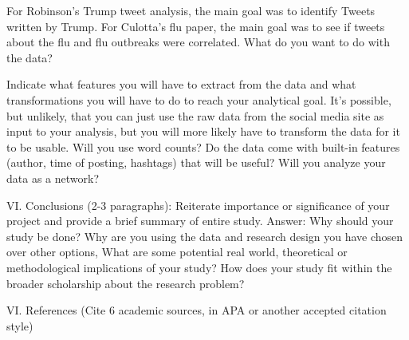 For Robinson's Trump tweet analysis, the main goal was to identify 
Tweets written by Trump. 
For Culotta's flu paper, the main goal was to see if tweets about the 
flu and flu outbreaks were correlated. 
What do you want to do with the data?

Indicate what features you will have to extract from the data and what transformations you will have to do to reach your analytical goal. It's possible, but unlikely, that you can just use the raw data from the social media site as input to your analysis, but you will more likely have to transform the data for it to be usable. Will you use word counts? Do the data come with built-in features (author, time of posting, hashtags) that will be useful? Will you analyze your data as a network?

VI. Conclusions (2-3 paragraphs):
Reiterate importance or significance of your project and provide a brief summary of entire study. Answer:
Why should your study be done?
Why are you using the data and research design you have chosen over other options,
What are some potential real world, theoretical or methodological implications of your study?
How does your study fit within the broader scholarship about the research problem?

VI. References (Cite 6 academic sources, in APA or another accepted citation style)
